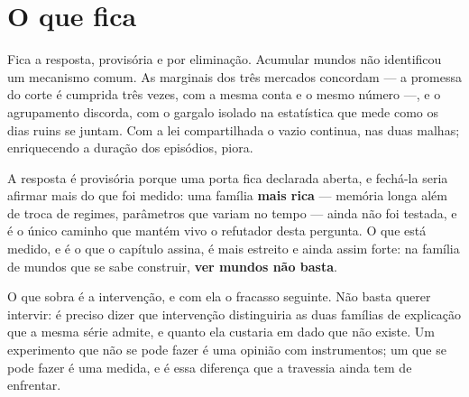 \section{O que fica}

Fica a resposta, provisória e por eliminação. Acumular mundos não identificou um mecanismo
comum. As marginais dos três mercados concordam --- a promessa do corte é cumprida
três vezes, com a mesma conta e o mesmo número ---, e o agrupamento discorda, com o gargalo
isolado na estatística que mede como os dias ruins se juntam\cite{bing2023invariance}. Com a lei compartilhada o vazio
continua, nas duas malhas; enriquecendo a duração dos episódios, piora.

A resposta é provisória porque uma porta fica declarada aberta, e fechá-la seria afirmar mais do
que foi medido: uma família \textbf{mais rica} --- memória longa além de troca de regimes, parâmetros
que variam no tempo \cite{palma2010efficient}\cite{dahlhaus2006nonparametric}\cite{palma2013estimation} --- ainda não foi testada, e é o único caminho que mantém vivo o refutador
desta pergunta. O que está medido, e é o que o capítulo assina, é mais estreito e ainda assim
forte: na família de mundos que se sabe construir, \textbf{ver mundos não basta}.

O que sobra é a intervenção, e com ela o fracasso seguinte. Não basta querer intervir: é preciso
dizer que intervenção distinguiria as duas famílias de explicação que a mesma série admite, e
quanto ela custaria em dado que não existe. Um experimento que não se pode fazer é uma opinião com
instrumentos; um que se pode fazer é uma medida, e é essa diferença que a travessia
ainda tem de enfrentar.
